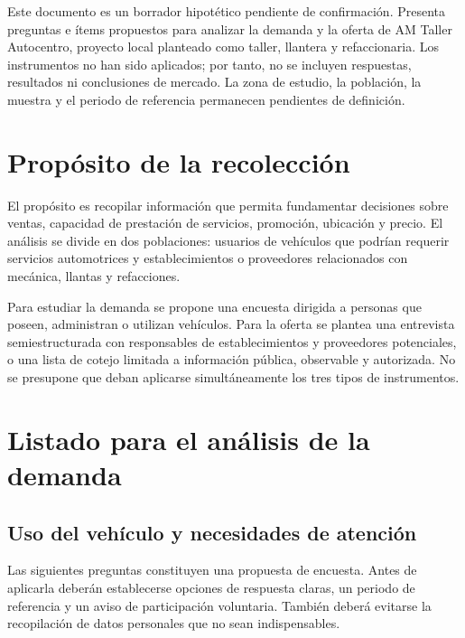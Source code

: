 \documentclass[12pt,letterpaper,oneside]{article}
\begin{document}
Este documento es un borrador hipotético pendiente de confirmación. Presenta preguntas e ítems propuestos para analizar la demanda y la oferta de AM Taller Autocentro, proyecto local planteado como taller, llantera y refaccionaria. Los instrumentos no han sido aplicados; por tanto, no se incluyen respuestas, resultados ni conclusiones de mercado. La zona de estudio, la población, la muestra y el periodo de referencia permanecen pendientes de definición.

\section{Propósito de la recolección}

El propósito es recopilar información que permita fundamentar decisiones sobre ventas, capacidad de prestación de servicios, promoción, ubicación y precio. El análisis se divide en dos poblaciones: usuarios de vehículos que podrían requerir servicios automotrices y establecimientos o proveedores relacionados con mecánica, llantas y refacciones.

Para estudiar la demanda se propone una encuesta dirigida a personas que poseen, administran o utilizan vehículos. Para la oferta se plantea una entrevista semiestructurada con responsables de establecimientos y proveedores potenciales, o una lista de cotejo limitada a información pública, observable y autorizada. No se presupone que deban aplicarse simultáneamente los tres tipos de instrumentos.

\section{Listado para el análisis de la demanda}

\subsection{Uso del vehículo y necesidades de atención}

Las siguientes preguntas constituyen una propuesta de encuesta. Antes de aplicarla deberán establecerse opciones de respuesta claras, un periodo de referencia y un aviso de participación voluntaria. También deberá evitarse la recopilación de datos personales que no sean indispensables.
\end{document}
